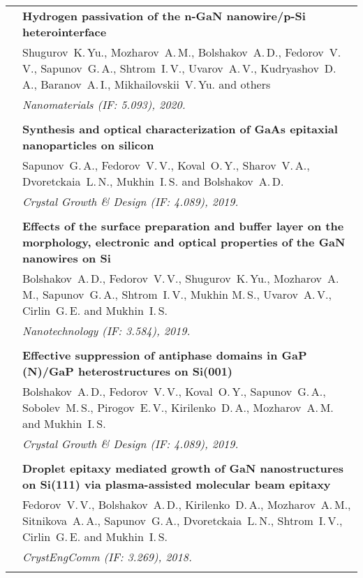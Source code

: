 \documentclass[letterpaper, 11pt]{article}
\begin{document}
\begin{longtable}{p{1.3in}p{4.8in}}
        & \textbf{Hydrogen passivation of the n-GaN nanowire/p-Si
        heterointerface} \\
        & Shugurov~K.\,Yu., Mozharov~A.\,M., Bolshakov~A.\,D., Fedorov~V.\,V.,
        Sapunov~G.\,A., Shtrom~I.\,V., Uvarov~A.\,V., Kudryashov~D.\,A.,
        Baranov~A.\,I., Mikhailovskii~V.\,Yu. and others \\
        & \textit{Nanomaterials (IF: 5.093), 2020.}\\
		& \\
		
        & \textbf{Synthesis and optical characterization of GaAs epitaxial
        nanoparticles on silicon} \\
        & Sapunov~G.\,A., Fedorov~V.\,V., Koval~O.\,Y., Sharov~V.\,A.,
        Dvoretckaia~L.\,N., Mukhin~I.\,S. and Bolshakov~A.\,D. \\
        & \textit{Crystal Growth \& Design (IF: 4.089), 2019.}\\
		& \\
		
        & \textbf{Effects of the surface preparation and buffer layer on the
        morphology, electronic and optical properties of the GaN nanowires on
        Si} \\ & Bolshakov~A.\,D., Fedorov~V.\,V., Shugurov~K.\,Yu., Mozharov~A.\,M.,
        Sapunov~G.\,A., Shtrom~I.\,V., Mukhin M.\,S., Uvarov~A.\,V.,
        Cirlin~G.\,E. and Mukhin~I.\,S. \\
        & \textit{Nanotechnology (IF: 3.584), 2019.}\\
		& \\
		
        & \textbf{Effective suppression of antiphase domains in GaP (N)/GaP
        heterostructures on Si(001)} \\
        & Bolshakov~A.\,D., Fedorov~V.\,V., Koval~O.\,Y., Sapunov~G.\,A.,
        Sobolev~M.\,S., Pirogov~E.\,V., Kirilenko~D.\,A., Mozharov~A.\,M. and
        Mukhin~I.\,S. \\
        & \textit{Crystal Growth \& Design (IF: 4.089), 2019.}\\
		& \\
		
        & \textbf{Droplet epitaxy mediated growth of GaN nanostructures on
        Si(111) via plasma-assisted molecular beam epitaxy} \\
        & Fedorov~V.\,V., Bolshakov~A.\,D., Kirilenko~D.\,A., Mozharov~A.\,M.,
        Sitnikova~A.\,A., Sapunov~G.\,A., Dvoretckaia~L.\,N., Shtrom~I.\,V.,
        Cirlin~G.\,E. and Mukhin~I.\,S. \\
        & \textit{CrystEngComm (IF: 3.269), 2018.}\\
		& \\


\end{longtable}
\end{document}
